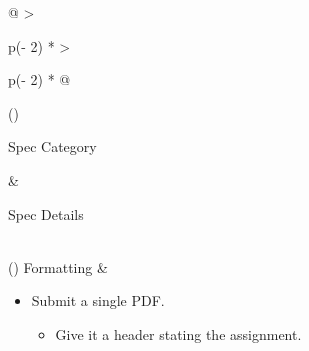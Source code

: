 \documentclass[
  letterpaper,
  DIV=11,
  numbers=noendperiod]{scrreprt}
\providecommand{\tightlist}{%
  \setlength{\itemsep}{0pt}\setlength{\parskip}{0pt}}\usepackage{longtable,booktabs,array}
\begin{document}
\begin{longtable}[]{@{}
  >{\raggedright\arraybackslash}p{(\columnwidth - 2\tabcolsep) * }
  >{\raggedright\arraybackslash}p{(\columnwidth - 2\tabcolsep) * }@{}}
\toprule()
\begin{minipage}[b]{\linewidth}\raggedright
Spec Category
\end{minipage} & \begin{minipage}[b]{\linewidth}\raggedright
Spec Details
\end{minipage} \\
\midrule()
\endhead
Formatting & \begin{minipage}[t]{\linewidth}\raggedright
\begin{itemize}
\item
  Submit a single PDF.

  \begin{itemize}
  \tightlist
  \item
    Give it a header stating the assignment.
  \end{itemize}


\end{itemize}
\end{minipage}
\end{longtable}
\end{document}
